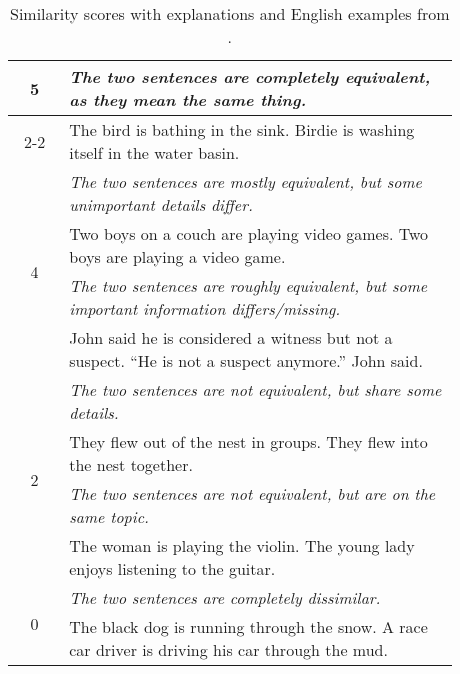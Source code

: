 \documentclass[11pt,a4paper]{article}
\begin{document}
\begin{table}[ht!]
\begin{center}
\small
{\renewcommand{\arraystretch}{1.25}
\begin{tabular}{|c|p{0.88\linewidth}|}
\hline
\multirow{4}{*}{5}& \emph{The two sentences are completely equivalent, as they mean the same thing.}\\
\cline{2-2}
& The bird is bathing in the sink. \newline Birdie is washing itself in the water basin. \\
\hline
\multirow{4}{*}{4}  & \emph{The two sentences are mostly equivalent, but some {\it unimportant} details differ.}\\
\cline{2-2}
& Two boys on a couch are playing video games. \newline Two boys are playing a video game. \\
\hline
\multirow{4}{*}{3} & \emph{The two sentences are roughly equivalent, but some {\it important information} differs/missing.}\\
\cline{2-2}
& John said he is considered a witness but not a suspect. \newline ``He is not a suspect anymore.'' John said.  \\
\hline
\multirow{4}{*}{2} & \emph{The two sentences are not equivalent, but share some details.}\\
\cline{2-2}
& They flew out of the nest in groups. \newline They flew into the nest together. \\
\hline
\multirow{4}{*}{1} & \emph{The two sentences are not equivalent, but are on the same topic.}\\
\cline{2-2}
& The woman is playing the violin. \newline The young lady enjoys listening to the guitar. \\
\hline
\multirow{4}{*}{0} & \emph{The two sentences are completely dissimilar.}\\
\cline{2-2}
& The black dog is running through the snow. \newline A race car driver is driving his car through the mud. \\
\hline
\end{tabular}
}
\end{center}
\caption{Similarity scores with explanations and English examples from .}
\label{fig:annotationcore}
\end{table}
\end{document}
